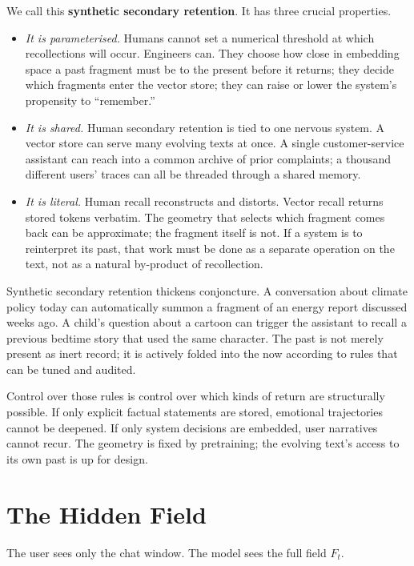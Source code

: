 \documentclass[12pt,a4paper]{article}
\begin{document}
We call this \textbf{synthetic secondary retention}. It has three crucial properties.

\begin{itemize}
  \item \emph{It is parameterised.} Humans cannot set a numerical threshold at which recollections will occur. Engineers can. They choose how close in embedding space a past fragment must be to the present before it returns; they decide which fragments enter the vector store; they can raise or lower the system's propensity to ``remember.''

  \item \emph{It is shared.} Human secondary retention is tied to one nervous system. A vector store can serve many evolving texts at once. A single customer-service assistant can reach into a common archive of prior complaints; a thousand different users' traces can all be threaded through a shared memory.

  \item \emph{It is literal.} Human recall reconstructs and distorts. Vector recall returns stored tokens verbatim. The geometry that selects which fragment comes back can be approximate; the fragment itself is not. If a system is to reinterpret its past, that work must be done as a separate operation on the text, not as a natural by-product of recollection.
\end{itemize}

Synthetic secondary retention thickens conjoncture. A conversation about climate policy today can automatically summon a fragment of an energy report discussed weeks ago. A child's question about a cartoon can trigger the assistant to recall a previous bedtime story that used the same character. The past is not merely present as inert record; it is actively folded into the now according to rules that can be tuned and audited.

Control over those rules is control over which kinds of return are structurally possible. If only explicit factual statements are stored, emotional trajectories cannot be deepened. If only system decisions are embedded, user narratives cannot recur. The geometry is fixed by pretraining; the evolving text's access to its own past is up for design.


\section{The Hidden Field}

The user sees only the chat window. The model sees the full field $F_t$.
\end{document}
